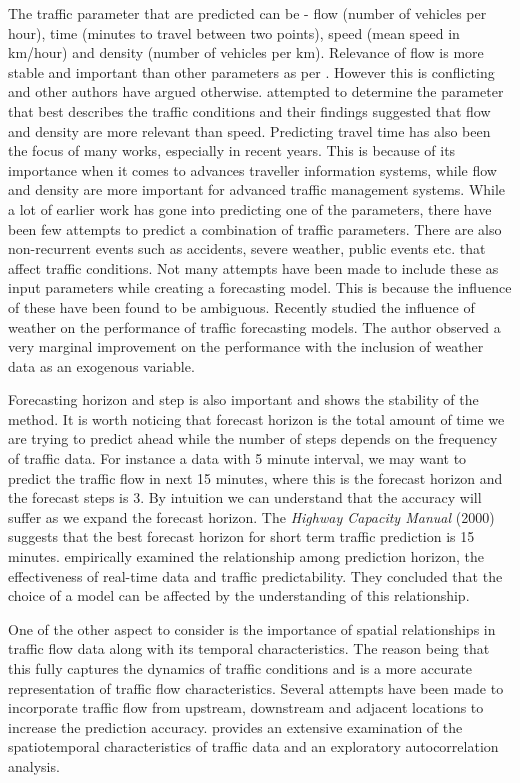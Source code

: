 The traffic parameter that are predicted can be - flow (number of vehicles per hour), time (minutes
to travel between two points), speed (mean speed in km/hour) and density (number of vehicles per km).
Relevance of flow is more stable and important than other parameters as per \citet{levin1980forecasting}.
However this is conflicting and other authors have argued otherwise. \citet{dougherty1997short} attempted
to determine the parameter that best describes the traffic conditions and their findings suggested that
flow and density are more relevant than speed. Predicting travel time has also been the focus of many
works, especially in recent years. This is because of its importance when it comes to advances traveller
information systems, while flow and density are more important for advanced traffic management systems.
While a lot of earlier work has gone into predicting one of the parameters, there have been few
attempts to predict a combination of traffic parameters. There are also non-recurrent events such as
accidents, severe weather, public events etc. that affect traffic conditions. Not many attempts have
been made to include these as input parameters while creating a forecasting model. This is because
the influence of these have been found to be ambiguous. Recently \citet{tsirigotis2012does}
studied the influence of weather on the performance of traffic forecasting models. The author observed
a very marginal improvement on the performance with the inclusion of weather data as an exogenous
variable.

Forecasting horizon and step is also important and shows the stability of the method. It is worth
noticing that forecast horizon is the total amount of time we are trying to predict ahead while
the number of steps depends on the frequency of traffic data. For instance a data with 5 minute interval,
we may want to predict the traffic flow in next 15 minutes, where this is the forecast horizon and the
forecast steps is 3. By intuition we can understand that the accuracy will suffer as we expand the
forecast horizon. The \textit{Highway Capacity Manual} (2000) suggests that the best forecast horizon
for short term traffic prediction is 15 minutes. \citet{yue2007prediction} empirically examined the
relationship among prediction horizon, the effectiveness of real-time data and traffic predictability.
They concluded that the choice of a model can be affected by the understanding of this relationship.

One of the other aspect to consider is the importance of spatial relationships in traffic flow data
along with its temporal characteristics. The reason being that this fully captures the dynamics of
traffic conditions and is a more accurate representation of traffic flow characteristics. Several
attempts have been made to incorporate traffic flow from upstream, downstream and adjacent locations
to increase the prediction accuracy. \citet{cheng2012spatio} provides an extensive examination of the
spatiotemporal characteristics of traffic data and an exploratory autocorrelation analysis.

